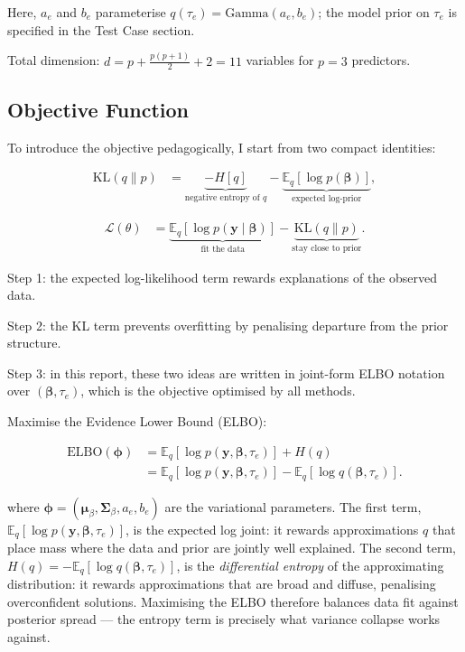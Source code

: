\documentclass[11pt,a4paper]{article}
\newcommand{\E}{\mathbb{E}}
\newcommand{\ELBO}{\text{ELBO}}
\begin{document}
Here, $a_e$ and $b_e$ parameterise $q(\tau_e)=\mathrm{Gamma}(a_e,b_e)$; 
the model prior on $\tau_e$ is specified in the Test Case section.  \vspace{1em} 

Total dimension: $d = p + \frac{p(p+1)}{2} + 2 = 11$ variables for $p=3$ predictors.

\subsection*{Objective Function}

To introduce the objective pedagogically, I start from two compact identities:

\begin{align}
\mathrm{KL}(q\|p)
&= \underbrace{-H[q]}_{\text{negative entropy of }q}
  - \underbrace{\E_q[\log p(\bm{\beta})]}_{\text{expected log-prior}},
\end{align}

\begin{align}
\mathcal{L}(\theta)
&= \underbrace{\E_q[\log p(\bm{y}\mid\bm{\beta})]}_{\text{fit the data}}
  - \underbrace{\mathrm{KL}(q\|p)}_{\text{stay close to prior}}.
\end{align}

Step 1: the expected log-likelihood term rewards explanations of the observed data.

Step 2: the KL term prevents overfitting by penalising departure from the prior structure.

Step 3: in this report, these two ideas are written in joint-form ELBO notation over $(\bm{\beta},\tau_e)$, which is the objective optimised by all methods.

Maximise the Evidence Lower Bound (ELBO):

\begin{align}
\ELBO(\bm{\phi})
&= \E_q[\log p(\bm{y}, \bm{\beta}, \tau_e)] + H(q) \\
&= \E_q[\log p(\bm{y}, \bm{\beta}, \tau_e)] - \E_q[\log q(\bm{\beta}, \tau_e)] .
\end{align}

where $\bm{\phi} = (\bm{\mu}_\beta, \bm{\Sigma}_\beta, a_e, b_e)$ are the variational parameters.
The first term, $\E_q[\log p(\bm{y}, \bm{\beta}, \tau_e)]$, is the expected log joint: it rewards approximations $q$ that place mass where the data and prior are jointly well explained.
The second term, $H(q) = -\E_q[\log q(\bm{\beta}, \tau_e)]$, is the \emph{differential entropy} of the approximating distribution: it rewards approximations that are broad and diffuse, penalising overconfident solutions.
Maximising the ELBO therefore balances data fit against posterior spread --- the entropy term is precisely what variance collapse works against.
\end{document}
